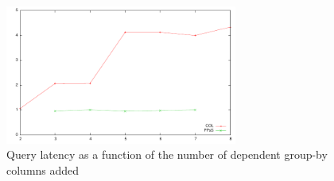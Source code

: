 \begin{figure}
\begin{center}
\includegraphics[width=3.0in]{images/aggvslatency.pdf}
\caption{Query latency as a function of the number of dependent group-by columns added}
\label{fig:aggvslatency}
\end{center}
\end{figure}

